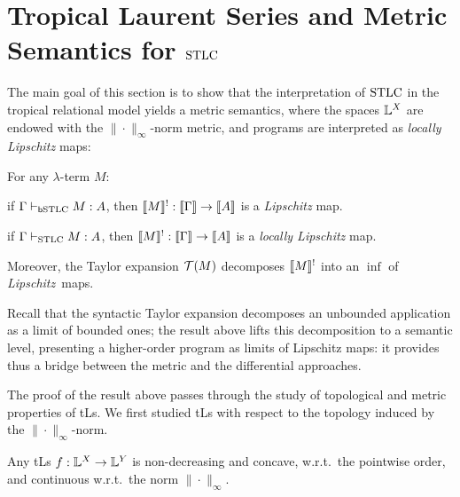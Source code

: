 \documentclass[submission,%
]{eptcs}
\begin{document}
\section{Tropical Laurent Series and Metric Semantics for $\mathrm{STLC}$}

The main goal of this section is to show that the interpretation of $\mathrm{STLC}$ in the tropical relational model yields a metric semantics, where the spaces $\mathbb{L}^{X}$ are endowed with the $\|\cdot\|_{\infty}$-norm metric, and programs are interpreted as \emph{locally Lipschitz} maps:
\begin{theorem}\label{cor:main}
For any $\lambda$-term $M$:
\begin{varenumerate}
\item if $\Gamma \vdash_{\mathsf b\mathrm{STLC}} M:A$, then $\llbracket M\rrbracket^!:\llbracket\Gamma\rrbracket \to \llbracket A\rrbracket$ is a \emph{Lipschitz} map.
\item if $\Gamma \vdash_{\mathrm{STLC}}M:A$, then $\llbracket M\rrbracket^!: \llbracket\Gamma\rrbracket \to \llbracket A\rrbracket$ is a \emph{locally Lipschitz} map.

Moreover, the Taylor expansion $\mathcal{T}(M)$ decomposes $\llbracket M\rrbracket^!$ into an $\inf$ of \emph{Lipschitz}~maps.
\end{varenumerate}
\end{theorem}
Recall that the syntactic Taylor expansion decomposes an unbounded application as a limit of bounded ones;
the result above lifts this decomposition to a semantic level, presenting a higher-order program as limits of Lipschitz maps: it provides thus a bridge between the metric and the differential approaches.

 
The proof of the result above passes through the study of topological and metric properties of tLs. 
We first studied tLs with respect to the topology induced by the $\|\cdot\|_{\infty}$-norm.
%
 
% 
%





\begin{proposition}\label{prop:nondecr+conc}
 Any tLs $f:\mathbb{L}^X\to\mathbb{L}^Y$ is non-decreasing and concave, w.r.t.\ the pointwise order, and continuous w.r.t.~the norm $\|\cdot\|_{\infty}$.
\end{proposition}
\end{document}

